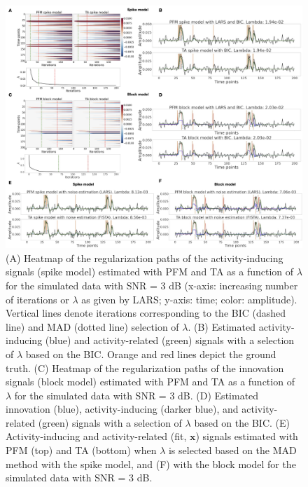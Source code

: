 \begin{figure}[t!]
    \begin{center}
        \includegraphics[width=\textwidth]{figures/synthesis_analysis/figure_sim.png}
    \end{center}
    \caption{(A) Heatmap of the regularization paths of the activity-inducing
    signals (spike model) estimated with PFM and TA as a function of $\lambda$
    for the simulated data with SNR = 3 dB (x-axis: increasing number of
    iterations or $\lambda$ as given by LARS; y-axis: time; color: amplitude).
    Vertical lines denote iterations corresponding to the BIC (dashed line) and
    MAD (dotted line) selection of $\lambda$. (B) Estimated activity-inducing
    (blue) and activity-related (green) signals with a selection of $\lambda$
    based on the BIC. Orange and red lines depict the ground truth. (C) Heatmap
    of the regularization paths of the innovation signals (block model)
    estimated with PFM and TA as a function of $\lambda$ for the simulated data
    with SNR = 3 dB. (D) Estimated innovation (blue), activity-inducing (darker
    blue), and activity-related (green) signals with a selection of $\lambda$
    based on the BIC. (E) Activity-inducing and activity-related (fit,
    $\mathbf{x}$) signals estimated with PFM (top) and TA (bottom) when
    $\lambda$ is selected based on the MAD method with the spike model, and (F)
    with the block model for the simulated data with SNR = 3 dB.}
\label{fig:sim}
\end{figure}

